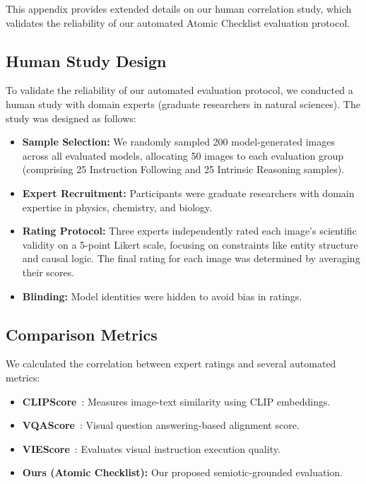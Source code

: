 \documentclass[runningheads]{llncs}
\begin{document}
This appendix provides extended details on our human correlation study, which validates the reliability of our automated Atomic Checklist evaluation protocol.

\subsection{Human Study Design}

To validate the reliability of our automated evaluation protocol, we conducted a human study with domain experts (graduate researchers in natural sciences). The study was designed as follows:

\begin{itemize}
    \item \textbf{Sample Selection:} We randomly sampled 200 model-generated images across all evaluated models, allocating 50 images to each evaluation group (comprising 25 Instruction Following and 25 Intrinsic Reasoning samples).
    \item \textbf{Expert Recruitment:} Participants were graduate researchers with domain expertise in physics, chemistry, and biology.
    \item \textbf{Rating Protocol:} Three experts independently rated each image's scientific validity on a 5-point Likert scale, focusing on constraints like entity structure and causal logic. The final rating for each image was determined by averaging their scores.
    \item \textbf{Blinding:} Model identities were hidden to avoid bias in ratings.
\end{itemize}

\subsection{Comparison Metrics}

We calculated the correlation between expert ratings and several automated metrics:

\begin{itemize}
    \item \textbf{CLIPScore}~\cite{hessel2021clipscore}: Measures image-text similarity using CLIP embeddings.
    \item \textbf{VQAScore}~\cite{lin2024evaluating}: Visual question answering-based alignment score.
    \item \textbf{VIEScore}~\cite{ku2024viescore}: Evaluates visual instruction execution quality.
    \item \textbf{Ours (Atomic Checklist):} Our proposed semiotic-grounded evaluation.
\end{itemize}
\end{document}
